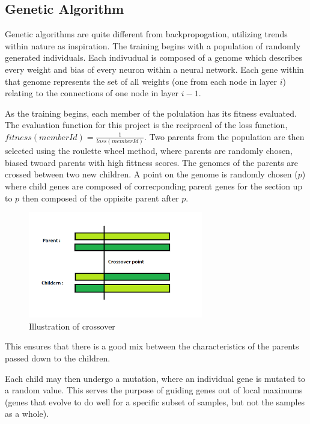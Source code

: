 \documentclass[12pt]{article}
\begin{document}
    \subsection{Genetic Algorithm}
        Genetic algorithms are quite different from backpropogation, utilizing trends within nature as inspiration.
        The training begins with a population of randomly generated individuals.  Each indivudual is composed of a genome which 
        describes every weight and bias of every neuron within a neural network.  Each gene within that genome represents
        the set of all weights (one from each node in layer \(i\)) relating to the connections of one node in layer \(i-1\).

        As the training begins, each member of the polulation has its fitness evaluated.  The evaluation function for this project
        is the reciprocal of the loss function, \(fitness(memberId) = \frac{1}{loss(memberId)}\).  Two parents from the population
        are then selected using the roulette wheel method, where parents are randomly chosen, biased twoard parents with high fittness scores.
        The genomes of the parents are crossed between two new children.  A point on the genome is randomly chosen (\(p\)) where
        child genes are composed of correcponding parent genes for the section up to \(p\) then composed of the oppisite parent after \(p\).
        \pagebreak
        \begin{figure}[h]
            \includegraphics[scale=.5]{crossover.png}
            \centering
            \caption{Illustration of crossover \cite{crossoverDiagram}}
        \end{figure}

        This ensures that there is a good mix between the characteristics of the parents passed down to the children.

        Each child may then undergo a mutation, where an individual gene is mutated to a random value.  This serves the
        purpose of guiding genes out of local maximums (genes that evolve to do well for a specific subset of samples, but
        not the samples as a whole).
        
\end{document}
